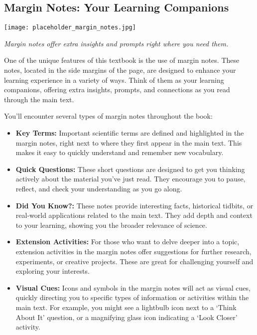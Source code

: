 \subsection{Margin Notes: Your Learning Companions}

\begin{marginfigure}[0pt]
\texttt{[image: placeholder\_margin\_notes.jpg]}
\caption*{\textit{Margin notes offer extra insights and prompts right where you need them.}}
\end{marginfigure}
\FloatBarrier

One of the unique features of this textbook is the use of margin notes.  These notes, located in the side margins of the page, are designed to enhance your learning experience in a variety of ways.  Think of them as your learning companions, offering extra insights, prompts, and connections as you read through the main text.

You'll encounter several types of margin notes throughout the book:

\begin{itemize}
    \item \textbf{Key Terms:}  Important scientific terms are defined and highlighted in the margin notes, right next to where they first appear in the main text.  This makes it easy to quickly understand and remember new vocabulary.
    \item \textbf{Quick Questions:}  These short questions are designed to get you thinking actively about the material you’ve just read.  They encourage you to pause, reflect, and check your understanding as you go along.
    \item \textbf{Did You Know?:}  These notes provide interesting facts, historical tidbits, or real-world applications related to the main text.  They add depth and context to your learning, showing you the broader relevance of science.
    \item \textbf{Extension Activities:} For those who want to delve deeper into a topic, extension activities in the margin notes offer suggestions for further research, experiments, or creative projects.  These are great for challenging yourself and exploring your interests.
    \item \textbf{Visual Cues:}  Icons and symbols in the margin notes will act as visual cues, quickly directing you to specific types of information or activities within the main text. For example, you might see a lightbulb icon next to a ‘Think About It’ question, or a magnifying glass icon indicating a ‘Look Closer’ activity.
\end{itemize}

